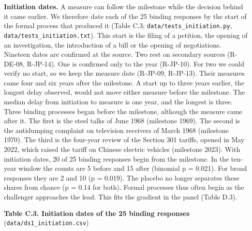 \textbf{Initiation dates.} A measure can follow the milestone while the
decision behind it came earlier. We therefore date each of the 25
binding responses by the start of the formal process that produced it
(Table C.3; \texttt{data/\allowbreak{}tests\_\allowbreak{}initiation.py},
\texttt{data/\allowbreak{}tests\_\allowbreak{}initiation.txt}). This start is the filing of a
petition, the opening of an investigation, the introduction of a bill or
the opening of negotiations. Nineteen dates are confirmed at the source.
Two rest on secondary sources (R-DE-08, R-JP-14). One is confirmed only
to the year (R-JP-10). For two we could verify no start, so we keep the
measure date (R-JP-09, R-JP-13). Their measures came four and six years
after the milestone. A start up to three years earlier, the longest
delay observed, would not move either measure before the milestone. The
median delay from initiation to measure is one year, and the longest is
three. Three binding processes began before the milestone, although the
measure came after it. The first is the steel talks of June 1968
(milestone 1969). The second is the antidumping complaint on television
receivers of March 1968 (milestone 1970). The third is the four-year
review of the Section 301 tariffs, opened in May 2022, which raised the
tariff on Chinese electric vehicles (milestone 2023). With initiation
dates, 20 of 25 binding responses begin from the milestone. In the
ten-year window the counts are 5 before and 15 after (binomial p =
0.021). For broad responses they are 2 and 10 (p = 0.019). The placebo
no longer separates these shares from chance (p = 0.14 for both). Formal
processes thus often begin as the challenger approaches the lead. This
fits the gradient in the panel (Table D.3).

\textbf{Table C.3. Initiation dates of the 25 binding responses}
(\texttt{data/\allowbreak{}ds1\_\allowbreak{}initiation.csv})

